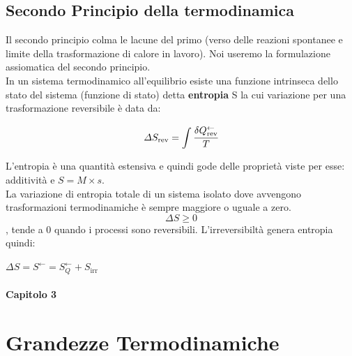 \documentclass[a4paper,12pt,titlepage]{article}
\begin{document}
\subsection{Secondo Principio della termodinamica}
Il secondo principio colma le lacune del primo (verso delle reazioni spontanee e limite della trasformazione di calore in lavoro). Noi useremo la formulazione assiomatica del secondo principio.\\
In un sistema termodinamico all'equilibrio esiste una funzione intrinseca dello stato del sistema (funzione di stato) detta \textbf{entropia} S la cui variazione per una trasformazione reversibile è data da:
\begin{center}
$$ \varDelta S_{\text{rev}} = \int \cfrac{\delta Q_{\text{rev}}^{\leftarrow}}{T}  $$ 
\end{center}
L'entropia è una quantità estensiva e quindi gode delle proprietà viste per esse: additività e $S = M \times s$. \\
La variazione di entropia totale di un sistema isolato dove avvengono trasformazioni termodinamiche è sempre maggiore o uguale a zero. $$ \varDelta S \geq 0 $$, tende a 0 quando i processi sono reversibili. 
\clearpage
L'irreversibiltà genera entropia quindi:
\begin{center}
$ \varDelta S = S^{\leftarrow}= S^{\leftarrow}_{Q} + S_{\text{irr}}$
\end{center}

\paragraph{Capitolo 3}
\section{Grandezze Termodinamiche}
\end{document}
